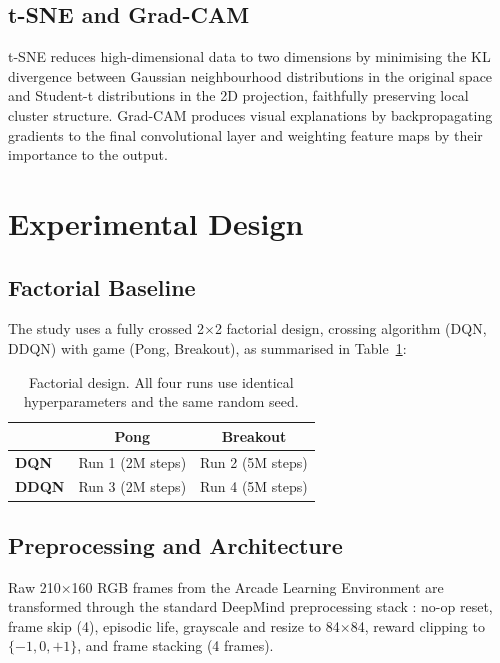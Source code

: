 \documentclass[a4paper]{article}
\begin{document}
\subsection{t-SNE and Grad-CAM}

t-SNE \cite{van2008visualizing} reduces high-dimensional data to two dimensions by
minimising the KL divergence between Gaussian neighbourhood distributions in the original
space and Student-t distributions in the 2D projection, faithfully preserving local cluster
structure. Grad-CAM \cite{selvaraju2017grad} produces visual explanations by backpropagating
gradients to the final convolutional layer and weighting feature maps by their importance
to the output.

\section{Experimental Design}
\label{sec:method}

\subsection{Factorial Baseline}

The study uses a fully crossed 2$\times$2 factorial design, crossing algorithm (DQN, DDQN)
with game (Pong, Breakout), as summarised in Table~\ref{tab:factorial}:

\begin{table}[H]
\centering
\caption{Factorial design. All four runs use identical hyperparameters and the same random seed.}
\label{tab:factorial}
\begin{tabular}{lcc}
\toprule
 & \textbf{Pong} & \textbf{Breakout} \\
\midrule
\textbf{DQN}  & Run 1 (2M steps) & Run 2 (5M steps) \\
\textbf{DDQN} & Run 3 (2M steps) & Run 4 (5M steps) \\
\bottomrule
\end{tabular}
\end{table}

\subsection{Preprocessing and Architecture}

Raw 210$\times$160 RGB frames from the Arcade Learning Environment \cite{bellemare2013arcade}
are transformed through the standard DeepMind preprocessing stack \cite{mnih2015human}:
no-op reset, frame skip (4), episodic life, grayscale and resize to 84$\times$84, reward
clipping to $\{-1, 0, +1\}$, and frame stacking (4 frames).
\end{document}
